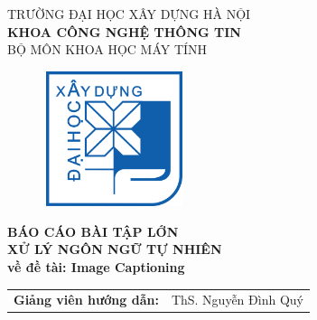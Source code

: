 \documentclass[main.tex]{subfiles}
\begin{document}
\begin{titlepage}

\begin{center}
\vspace{-8pt} {\fontsize{16pt}{0pt}\selectfont TRƯỜNG ĐẠI HỌC XÂY DỰNG HÀ NỘI} \\
\vspace{0.1cm}
\textbf{\fontsize{16pt}{0pt}\selectfont KHOA CÔNG NGHỆ THÔNG TIN}\\
\vspace{0.1cm}
{\fontsize{16pt}{0pt}\selectfont BỘ MÔN KHOA HỌC MÁY TÍNH}\\

\vspace{1cm}
 \begin{figure}[H]
     \centering
     \includegraphics[width=41.56mm, height=39.55mm]{Image/logodhxd.png}
 \end{figure}

\vspace{1cm}
\textbf{\fontsize{25pt}{0pt}\selectfont BÁO CÁO BÀI TẬP LỚN\\XỬ LÝ NGÔN NGỮ TỰ NHIÊN}\\[1cm]
\textbf{\fontsize{20pt}{0pt}\selectfont về đề tài: Image Captioning}\\[1cm]
\vspace{0.3cm}

\begin{table}[H]
\centering
\begin{tabular}{l l}
{\textbf{\fontsize{16pt}{0pt}\selectfont Giảng viên hướng dẫn:}} & {\fontsize{16pt}{0pt}\selectfont ThS. Nguyễn Đình Quý}\vspace{10pt}\\


\end{tabular}
\end{table}
\end{center}
\end{titlepage}
\end{document}
